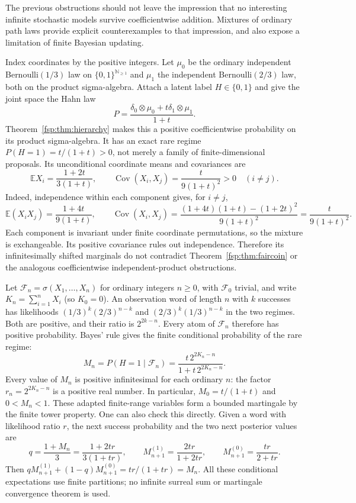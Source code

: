 \documentclass[11pt,a4paper]{article}
\numberwithin{equation}{section}
\theoremstyle{definition}
\theoremstyle{remark}
\newcommand{\N}{\mathbb N}
\newcommand{\E}{\mathbb E}
\newcommand{\F}{\mathcal F}
\newcommand{\Cov}{\operatorname{Cov}}
\begin{document}
The previous obstructions should not leave the impression that no
interesting infinite stochastic models survive coefficientwise addition.
Mixtures of ordinary path laws provide explicit counterexamples to that
impression, and also expose a limitation of finite Bayesian updating.

Index coordinates by the positive integers. Let $\mu_0$ be the ordinary
independent Bernoulli$(1/3)$ law on $\{0,1\}^{\N_{\ge1}}$ and $\mu_1$
the independent Bernoulli$(2/3)$ law, both on the product sigma-algebra.
Attach a latent label $H\in\{0,1\}$ and give the joint space the Hahn law
\begin{equation}\label{fsp:eq:latentlaw}
 P=\frac{\delta_0\otimes\mu_0+t\delta_1\otimes\mu_1}{1+t}.
\end{equation}
Theorem~\ref{fsp:thm:hierarchy} makes this a positive coefficientwise
probability on its product sigma-algebra. It has an exact rare regime
$P(H=1)=t/(1+t)>0$, not merely a family of finite-dimensional proposals.
Its unconditional coordinate means and covariances are
\begin{equation}\label{fsp:eq:latentcov}
 \E X_i=\frac{1+2t}{3(1+t)},\qquad
 \Cov(X_i,X_j)=\frac{t}{9(1+t)^2}>0\quad(i\ne j).
\end{equation}
Indeed, independence within each component gives, for $i\ne j$,
\[
 \E(X_iX_j)=\frac{1+4t}{9(1+t)},\qquad
 \Cov(X_i,X_j)
 =\frac{(1+4t)(1+t)-(1+2t)^2}{9(1+t)^2}
 =\frac{t}{9(1+t)^2}.
\]
Each component is invariant under finite coordinate permutations, so the
mixture is exchangeable. Its positive covariance rules out independence.
Therefore its infinitesimally shifted
marginals do not contradict Theorem~\ref{fsp:thm:faircoin} or the analogous
coefficientwise independent-product obstructions.

Let $\F_n=\sigma(X_1,\ldots,X_n)$ for ordinary integers $n\ge0$, with
$\F_0$ trivial, and write $K_n=\sum_{i=1}^nX_i$ (so $K_0=0$).
An observation word of length $n$ with $k$ successes has likelihoods
$(1/3)^k(2/3)^{n-k}$ and $(2/3)^k(1/3)^{n-k}$ in the two regimes.
Both are positive, and their ratio is $2^{2k-n}$. Every atom of $\F_n$
therefore has positive probability. Bayes' rule gives the finite conditional
probability of the rare regime:
\begin{equation}\label{fsp:eq:latentposterior}
 M_n=P(H=1\mid\F_n)
 =\frac{t\,2^{2K_n-n}}{1+t\,2^{2K_n-n}}.
\end{equation}
Every value of $M_n$ is positive infinitesimal for each ordinary $n$:
the factor $r_n=2^{2K_n-n}$ is a positive real number. In particular,
$M_0=t/(1+t)$ and $0<M_n<1$. These adapted finite-range variables
form a bounded martingale by the finite tower property. One can also
check this directly. Given a word with likelihood ratio $r$, the next
success probability and the two next posterior values are
\[
 q=\frac{1+M_n}{3}=\frac{1+2tr}{3(1+tr)},\qquad
 M_{n+1}^{(1)}=\frac{2tr}{1+2tr},\qquad
 M_{n+1}^{(0)}=\frac{tr}{2+tr}.
\]
Then $qM_{n+1}^{(1)}+(1-q)M_{n+1}^{(0)}=tr/(1+tr)=M_n$.
All these conditional expectations use finite partitions; no infinite
surreal sum or martingale convergence theorem is used.
\end{document}
